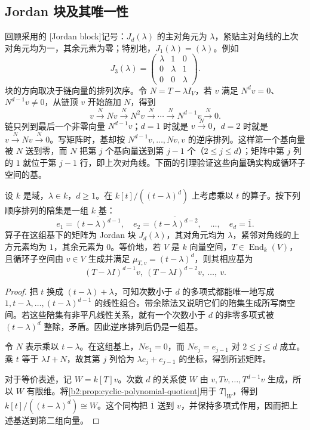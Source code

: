 \subsection{Jordan 块及其唯一性}
\label{b2:subsec:0405:02}

回顾采用的 [Jordan block]记号：\(J_d(\lambda)\) 的主对角元为 \(\lambda\)，紧贴主对角线的上次对角元均为一，其余元素为零；特别地，\(J_1(\lambda)=(\lambda)\)。例如
\[
	J_3(\lambda)=
	\begin{pmatrix}
		\lambda&1&0\\
		0&\lambda&1\\
		0&0&\lambda
	\end{pmatrix}.
\]
块的方向取决于链向量的排列次序。令 \(N=T-\lambda I_V\)，若 \(v\) 满足 \(N^dv=0\)、\(N^{d-1}v\ne0\)，从链顶 \(v\) 开始施加 \(N\)，得到
\[
	v\xrightarrow{\,N\,}Nv\xrightarrow{\,N\,}N^2v \xrightarrow{\,N\,}\cdots\xrightarrow{\,N\,}N^{d-1}v \xrightarrow{\,N\,}0.
\]
链只列到最后一个非零向量 \(N^{d-1}v\)；\(d=1\) 时就是 \(v\xrightarrow{N}0\)，\(d=2\) 时就是 \(v\xrightarrow{N}Nv\xrightarrow{N}0\)。写矩阵时，基却按 \(N^{d-1}v,\ldots,Nv,v\) 的逆序排列。这样第一个基向量被 \(N\) 送到零，而 \(N\) 把第 \(j\) 个基向量送到第 \(j-1\) 个（\(2\le j\le d\)）；矩阵中第 \(j\) 列的 \(1\) 就位于第 \(j-1\) 行，即上次对角线。下面的引理验证这些向量确实构成循环子空间的基。

\begin{lemma}\label{b2:lem:jordan-chain-block}
	设 \(k\) 是域，\(\lambda\in k\)，\(d\ge1\)。在 \(k[t]/((t-\lambda)^d)\) 上考虑乘以 \(t\) 的算子。按下列顺序排列的陪集是一组 \(k\) 基：
	\[
		e_1=\overline{(t-\lambda)^{d-1}},\quad e_2=\overline{(t-\lambda)^{d-2}},\quad\ldots,\quad e_d=\overline1.
	\]
	算子在这组基下的矩阵为 Jordan 块 \(J_d(\lambda)\)，其对角元均为 \(\lambda\)，紧邻对角线的上方元素均为 \(1\)，其余元素为 \(0\)。等价地，若 \(V\) 是 \(k\) 向量空间，\(T\in\operatorname{End}_k(V)\)，且循环子空间由 \(v\in V\) 生成并满足 \(\mu_{T,v}=(t-\lambda)^d\)，则其相应基为
	\[
		(T-\lambda I)^{d-1}v,\ (T-\lambda I)^{d-2}v,\ \ldots,\ v.
	\]
\end{lemma}
\begin{proof}
	把 \(t\) 换成 \((t-\lambda)+\lambda\)，可知次数小于 \(d\) 的多项式都能唯一地写成 \(1,t-\lambda,\ldots,(t-\lambda)^{d-1}\) 的线性组合。带余除法又说明它们的陪集生成所写商空间。若这些陪集有非平凡线性关系，就有一个次数小于 \(d\) 的非零多项式被 \((t-\lambda)^d\) 整除，矛盾。因此逆序排列后仍是一组基。

	令 \(N\) 表示乘以 \(t-\lambda\)。在这组基上，\(Ne_1=0\)，而 \(Ne_j=e_{j-1}\) 对 \(2\le j\le d\) 成立。乘 \(t\) 等于 \(\lambda I+N\)，故其第 \(j\) 列恰为 \(\lambda e_j+e_{j-1}\) 的坐标，得到所述矩阵。

	对于等价表述，记 \(W=k[T]v\)。次数 \(d\) 的关系使 \(W\) 由 \(v,Tv,\ldots,T^{d-1}v\) 生成，所以 \(W\) 有限维。将\cref{b2:prop:cyclic-polynomial-quotient}用于 \(T|_W\)，得到 \(k[t]/((t-\lambda)^d)\cong W\)。这个同构把 \(\overline1\) 送到 \(v\)，并保持多项式作用，因而把上述基送到第二组向量。
\end{proof}

